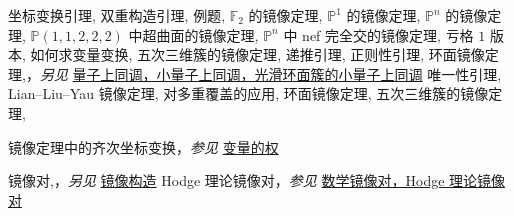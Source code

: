 \begin{theindex}
\subsubitem \leavevmode\hypertarget{idx:0849}{坐标变换引理},\enspace{}
\subsubitem \leavevmode\hypertarget{idx:0850}{双重构造引理},\enspace{}
\subsubitem \leavevmode\hypertarget{idx:0851}{例题},\enspace{}
\subsubitem \leavevmode\hypertarget{idx:0852}{$\mathbb F_2$ 的镜像定理},\enspace{}
\subsubitem \leavevmode\hypertarget{idx:0853}{$\mathbb P^1$ 的镜像定理},\enspace{}
\subsubitem \leavevmode\hypertarget{idx:0854}{$\mathbb P^n$ 的镜像定理},\enspace{}
\subsubitem \leavevmode\hypertarget{idx:0855}{$\mathbb P(1,1,2,2,2)$ 中超曲面的镜像定理},\enspace{}
\subsubitem \leavevmode\hypertarget{idx:0856}{$\mathbb P^n$ 中 nef 完全交的镜像定理},\enspace{}
\subsubitem \leavevmode\hypertarget{idx:0857}{亏格 $1$ 版本},\enspace{}
\subsubitem \leavevmode\hypertarget{idx:0858}{如何求变量变换},\enspace{}
\subsubitem \leavevmode\hypertarget{idx:0859}{五次三维簇的镜像定理},\enspace{}
\subsubitem \leavevmode\hypertarget{idx:0860}{递推引理},\enspace{}
\subsubitem \leavevmode\hypertarget{idx:0861}{正则性引理},\enspace{}
\subsubitem \leavevmode\hypertarget{idx:0862}{环面镜像定理},\enspace{}，\textit{另见} \hyperlink{idx:1141}{量子上同调，小量子上同调，光滑环面簇的小量子上同调}
\subsubitem \leavevmode\hypertarget{idx:0863}{唯一性引理},\enspace{}
\subitem \leavevmode\hypertarget{idx:0864}{Lian--Liu--Yau 镜像定理},\enspace{}
\subsubitem \leavevmode\hypertarget{idx:0865}{对多重覆盖的应用},\enspace{}
\subsubitem \leavevmode\hypertarget{idx:0866}{环面镜像定理},\enspace{}
\subitem \leavevmode\hypertarget{idx:0867}{五次三维簇的镜像定理},\enspace{}
\indexspace
\item \leavevmode\hypertarget{idx:0613}{镜像定理中的齐次坐标变换}，\textit{参见} \hyperlink{idx:1438}{变量的权}
\indexspace
\item \leavevmode\hypertarget{idx:0826}{镜像对},\enspace{}，\textit{另见} \hyperlink{idx:0798}{镜像构造}
\subitem \leavevmode\hypertarget{idx:0827}{Hodge 理论镜像对}，\textit{参见} \hyperlink{idx:0754}{数学镜像对，Hodge 理论镜像对}

\end{theindex}
